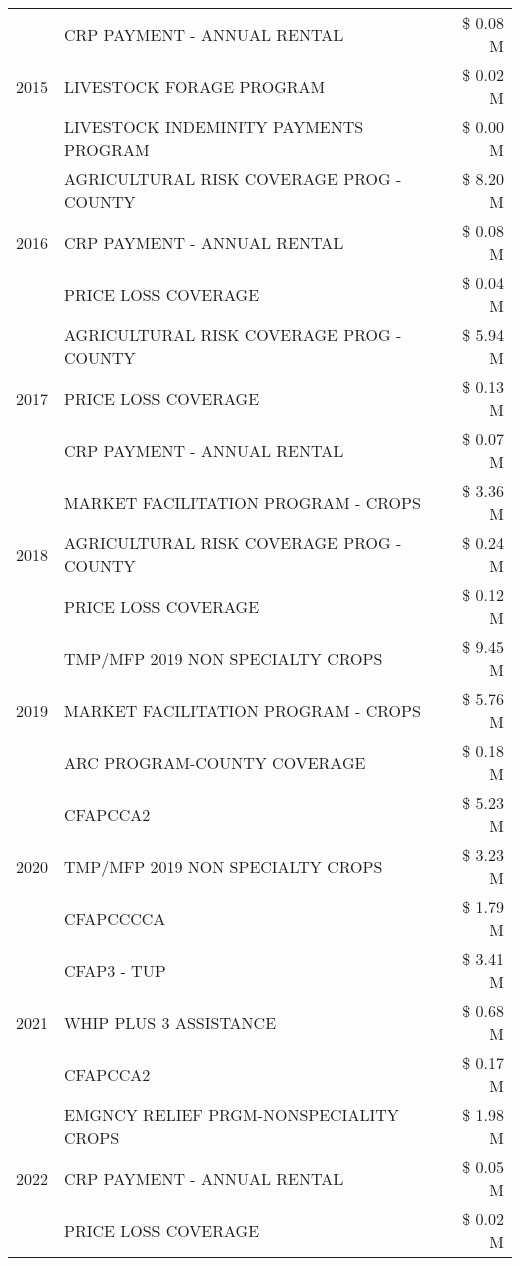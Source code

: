 \begin{tabular}{llr}
\multirow[t]{3}{*}{2015} & CRP PAYMENT - ANNUAL RENTAL & \$ 0.08 M \\
 & LIVESTOCK FORAGE PROGRAM & \$ 0.02 M \\
 & LIVESTOCK INDEMINITY PAYMENTS PROGRAM & \$ 0.00 M \\
\cline{1-3}
\multirow[t]{3}{*}{2016} & AGRICULTURAL RISK COVERAGE PROG - COUNTY & \$ 8.20 M \\
 & CRP PAYMENT - ANNUAL RENTAL & \$ 0.08 M \\
 & PRICE LOSS COVERAGE & \$ 0.04 M \\
\cline{1-3}
\multirow[t]{3}{*}{2017} & AGRICULTURAL RISK COVERAGE PROG - COUNTY & \$ 5.94 M \\
 & PRICE LOSS COVERAGE & \$ 0.13 M \\
 & CRP PAYMENT - ANNUAL RENTAL & \$ 0.07 M \\
\cline{1-3}
\multirow[t]{3}{*}{2018} & MARKET FACILITATION PROGRAM - CROPS & \$ 3.36 M \\
 & AGRICULTURAL RISK COVERAGE PROG - COUNTY & \$ 0.24 M \\
 & PRICE LOSS COVERAGE & \$ 0.12 M \\
\cline{1-3}
\multirow[t]{3}{*}{2019} & TMP/MFP 2019 NON SPECIALTY CROPS & \$ 9.45 M \\
 & MARKET FACILITATION PROGRAM - CROPS & \$ 5.76 M \\
 & ARC PROGRAM-COUNTY COVERAGE & \$ 0.18 M \\
\cline{1-3}
\multirow[t]{3}{*}{2020} & CFAPCCA2 & \$ 5.23 M \\
 & TMP/MFP 2019 NON SPECIALTY CROPS & \$ 3.23 M \\
 & CFAPCCCCA & \$ 1.79 M \\
\cline{1-3}
\multirow[t]{3}{*}{2021} & CFAP3 - TUP & \$ 3.41 M \\
 & WHIP PLUS 3 ASSISTANCE & \$ 0.68 M \\
 & CFAPCCA2 & \$ 0.17 M \\
\cline{1-3}
\multirow[t]{3}{*}{2022} & EMGNCY RELIEF PRGM-NONSPECIALITY CROPS & \$ 1.98 M \\
 & CRP PAYMENT - ANNUAL RENTAL & \$ 0.05 M \\
 & PRICE LOSS COVERAGE & \$ 0.02 M \\
\cline{1-3}
\bottomrule
\end{tabular}
